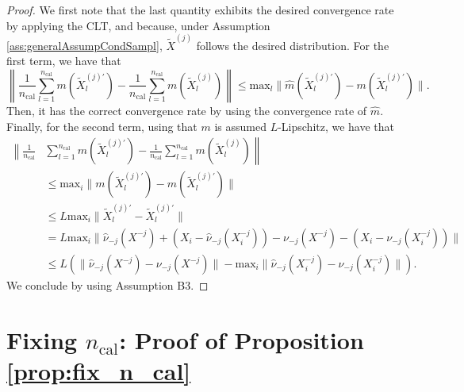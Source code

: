 \documentclass{article}
\theoremstyle{plain}
\theoremstyle{definition}
\theoremstyle{remark}
\begin{document}
\begin{proof}
We first note that the last quantity exhibits the desired convergence rate by applying the CLT, and because, under Assumption \ref{ass:generalAssumpCondSampl}, $\widetilde{X}^{(j)}$ follows the desired distribution. For the first term, we have that
$$ \left\|\frac{1}{n_\mathrm{cal}}\sum_{l=1}^{n_\mathrm{cal}}m\left(\widetilde{X}_{l}^{(j)'}\right)-\frac{1}{n_\mathrm{cal}}\sum_{l=1}^{n_\mathrm{cal}}m(\widetilde{X}_{l}^{(j)})\right\|\leq \mathrm{max}_{l}\|\widehat{m}(\widetilde{X}_l^{(j)'})-m(\widetilde{X}_l^{(j)'})\|.$$ Then, it has the correct convergence rate by using the convergence rate of $\widehat{m}$. Finally, for the second term, using that $m$ is assumed $L$-Lipschitz, we have that 
\begin{align*}
    \left\|\frac{1}{n_\mathrm{cal}}\right.&\left.\sum_{l=1}^{n_\mathrm{cal}}m(\widetilde{X}_{l}^{(j)'})-\frac{1}{n_\mathrm{cal}}\sum_{l=1}^{n_\mathrm{cal}}m(\widetilde{X}_{l}^{(j)})\right\|\\&\leq \mathrm{max}_{i}\|m(\widetilde{X}_{l}^{(j)'})-m(\widetilde{X}_{l}^{(j)'})\|\\&\leq L\mathrm{max}_{i}\|\widetilde{X}_{l}^{(j)'}-\widetilde{X}_{l}^{(j)'}\|\\
    &=L\mathrm{max}_{i}\| \widehat{\nu}_{-j}(X^{-j})+(X_i-\widehat{\nu}_{-j}(X_i^{-j}))-\nu_{-j}(X^{-j})-(X_i-\nu_{-j}(X_i^{-j}))\|\\
    &\leq L\left(\|\widehat{\nu}_{-j}(X^{-j})-\nu_{-j}(X^{-j})\|-\mathrm{max}_i\|\widehat{\nu}_{-j}(X_i^{-j})-\nu_{-j}(X_i^{-j})\|\right). 
\end{align*}
We conclude by using Assumption B3. 
\end{proof}

\section{Fixing $n_\mathrm{cal}$: Proof of Proposition \ref{prop:fix_n_cal}}
\end{document}
